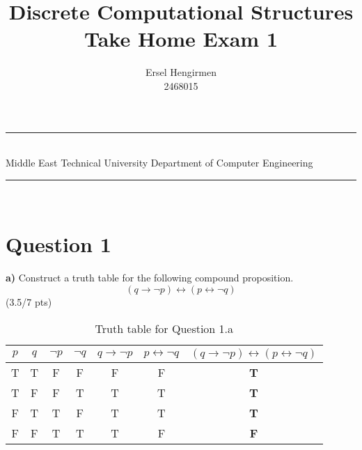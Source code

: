 \documentclass[a4paper,12pt]{article}
\title{Discrete Computational Structures \\ Take Home Exam 1}
\author{Ersel Hengirmen \\ 2468015} %
\date{} %
\newcommand{\HRule}{\rule{\linewidth}{1mm}}
\newcommand\tab[1][1cm]{\hspace*{#1}}
\begin{document}
	\HRule\\
	Middle East Technical University \hfill Department of Computer Engineering
	{\let\newpage\relax\maketitle}
	\HRule\\
	\vspace{1cm}
	
	
	\section*{Question 1 \hfill {}}
	
	\tab \textbf{a)} Construct a truth table for the following compound proposition.
	\begin{equation*}
	(q \rightarrow \neg p)\leftrightarrow (p \leftrightarrow \neg q)
	\end{equation*} 
	\hfill \small{(3.5/7 pts)} \\
	\begin{tcolorbox}
		\begin{table}[H]
			\small
			\centering
			\caption{ Truth table for Question 1.a }
			\begin{tabular}{|c|c|c|c|cc|c|}	
				\hline 							
				\textbf{$p$} & \textbf{$q$} & \textbf{$\neg p$} & \textbf{$\neg q$} &  \textbf{$q\rightarrow \neg p$} & \textbf{$p \leftrightarrow \neg q$} & \textbf{$(q\rightarrow \neg p)\leftrightarrow(p \leftrightarrow \neg q)$}   \\
				\hline 
				\hline 
				T & T & F & F & F & F &\textbf{T} \\ \hline
				T & F & F & T & T & T &\textbf{T} \\ \hline
				F & T & T & F & T & T &\textbf{T} \\ \hline
				F & F & T & T & T & F &\textbf{F} \\ \hline
			\end{tabular}
		\end{table}
	\end{tcolorbox}
\newpage
	
\end{document}
